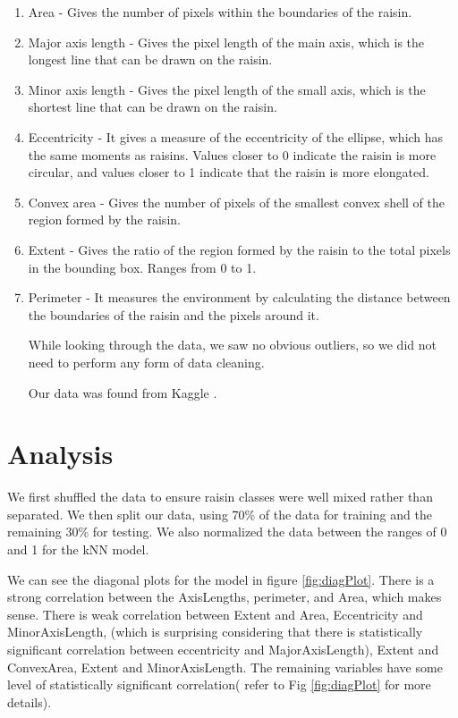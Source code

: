 \documentclass{article}
\begin{document}
\begin{enumerate}
    \item Area - Gives the number of pixels within the boundaries of the raisin.
\item Major axis length - Gives the pixel length of the main axis, which is the longest line that can be drawn on the raisin.

\item Minor axis length - Gives the pixel length of the small axis, which is the shortest line that can be drawn on the raisin.

\item Eccentricity - It gives a measure of the eccentricity of the ellipse, which has the same moments as raisins.  Values closer to 0 indicate the raisin is more circular, and values closer to 1 indicate that the raisin is more elongated.

\item Convex area - Gives the number of pixels of the smallest convex shell of the region formed by the raisin.

\item Extent - Gives the ratio of the region formed by the raisin to the total pixels in the bounding box.  Ranges from 0 to 1.

\item Perimeter - It measures the environment by calculating the distance between the boundaries of the raisin and the pixels around it.

While looking through the data, we saw no obvious outliers, so we did not need to perform any form of data cleaning. 

Our data was found from Kaggle \cite{Raisin}. 

\end{enumerate}

\section*{Analysis}

We first shuffled the data to ensure raisin classes were well mixed rather than separated. We then split our data, using 70\% of the data for training and the remaining 30\% for testing. We also normalized the data between the ranges of 0 and 1 for the kNN model. 

We can see the diagonal plots for the model in figure \ref{fig:diagPlot}. There is a strong correlation between the AxisLengths, perimeter, and  Area, which makes sense. There is weak correlation between Extent and Area, Eccentricity and MinorAxisLength, (which is surprising considering that there is statistically significant correlation between eccentricity and MajorAxisLength), Extent and ConvexArea, Extent and MinorAxisLength. The remaining variables have some level of statistically significant correlation( refer to Fig \ref{fig:diagPlot} for more details).
\end{document}
